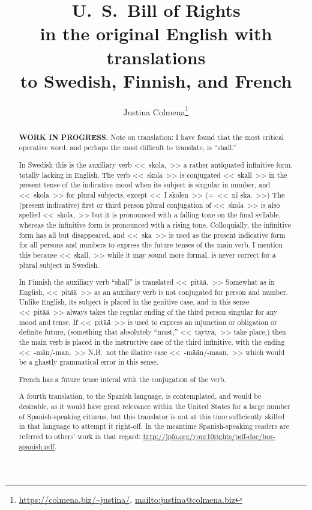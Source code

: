 \documentclass[a4,landscape,12pt]{article}
\title{{\huge \textbf{U.~S.\ Bill of Rights}}\\
	in the original English with translations\\
	to Swedish, Finnish, and French}
\author{Justina Colmena\footnote{\url{https://colmena.biz/~justina/}, \url{mailto:justina@colmena.biz}}}
\begin{document}
	
\sloppy\centering
\maketitle
\begin{abstract}
	{\color{red}\textbf{WORK IN PROGRESS.}}  Note on translation:  I have found that the most critical operative word, and perhaps the most difficult to translate, is ``shall.''
	
	In Swedish this is the auxiliary verb \foreignlanguage{swedish}{<<~skola,~>>} a rather antiquated infinitive form, totally lacking in English.  The verb \foreignlanguage{swedish}{<<~skola~>>} is conjugated \foreignlanguage{swedish}{<<~skall~>>} in the present tense of the indicative mood when its subject is singular in number, and \foreignlanguage{swedish}{<<~skola~>>} for plural subjects, except \foreignlanguage{swedish}{<<~I skolen~>> (=~<<~ni ska.~>>)}  The (present indicative) first or third person plural conjugation of \foreignlanguage{swedish}{<<~skola~>>} is also spelled \foreignlanguage{swedish}{<<~skola,~>>} but it is pronounced with a falling tone on the final syllable, whereas the infinitive form is pronounced with a rising tone.  Colloquially, the infinitive form has all but disappeared, and \foreignlanguage{swedish}{<<~ska~>>} is used as the present indicative form for all persons and numbers to express the future tenses of the main verb.  I mention this because \foreignlanguage{swedish}{<<~skall,~>>} while it may sound more formal, is never correct for a plural subject in Swedish.
		
	In Finnish the auxiliary verb ``shall'' is translated \foreignlanguage{finnish}{<<~pitää.~>>}  Somewhat as in English, \foreignlanguage{finnish}{<<~pitää~>>} as an auxiliary verb is not conjugated for person and number.  Unlike English, its subject is placed in the genitive case, and in this sense \foreignlanguage{finnish}{<<~pitää~>>}  always takes the regular ending of the third person singular for any mood and tense.  If \foreignlanguage{finnish}{<<~pitää~>>} is used to express an injunction or obligation or definite future, (something that absolutely ``must,'' \foreignlanguage{finnish}{<<~täytyä,~>>} take place,) then the main verb is placed in the instructive case of the third infinitive, with the ending \foreignlanguage{finnish}{<<~\mbox{-män/-man,}~>>} N.B.\ not the illative case \foreignlanguage{finnish}{<<~\mbox{-mään/-maan,}~>>} which would be a ghastly grammatical error in this sense.

	French has a future tense interal with the conjugation of the verb.
	
	A fourth translation, to the Spanish language, is contemplated, and would be desirable, as it would have great relevance within the United States for a large number of Spanish-speaking citizens, but this translator is not at this time sufficiently skilled in that language to attempt it right-off. In the meantime Spanish-speaking readers are referred to others' work in that regard: \foreignlanguage{spanish}{\url{http://jpfo.org/your10rights/pdf-doc/bor-spanish.pdf}}.
	\end{abstract}
\end{document}
